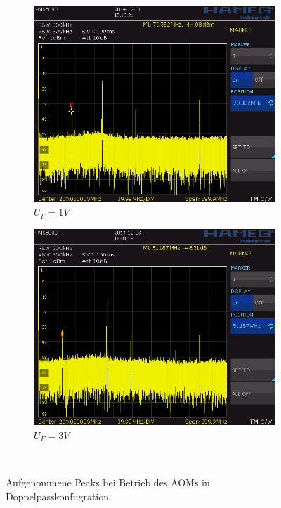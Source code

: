 \documentclass[bigchapter,colorback,accentcolor=tud4b,linedtoc,11pt]{tudreport}
\begin{document}
\begin{figure}[H]
  \centering
  \begin{subfigure}[H]{0.45\textwidth}
    \includegraphics[width=\textwidth]{data/Aufgabe6/frequ_Uf_1.png}
    \caption[Cap for listoffigures]{$U_F = 1V$}
    \label{fig:UF1}
  \end{subfigure}
  \begin{subfigure}[H]{0.45\textwidth}
    \includegraphics[width=\textwidth]{data/Aufgabe6/Aufgabe6_Uf3V_AOMein.png}
    \caption[Cap for listoffigures]{$U_F = 3V$}
    \label{fig:UF3}
  \end{subfigure}~%
  \caption{Aufgenommene Peaks bei Betrieb des AOMs in Doppelpasskonfugration\cite{AndereGruppe}.}\label{fig:doublepasspeaks}
\end{figure}
\end{document}
